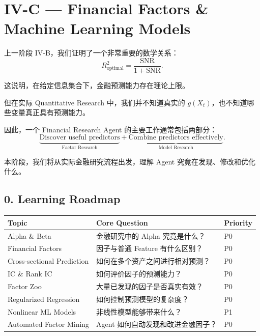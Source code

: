 \hypertarget{part-4-63-0001-iv-c-financial-factors-machine-learning-models}{%
\section{IV-C --- Financial Factors \& Machine Learning Models}\label{part-4-63-0001-iv-c-financial-factors-machine-learning-models}}

上一阶段 IV-B，我们证明了一个非常重要的数学关系：
\[R_{\mathrm{optimal}}^2
=
\frac{\mathrm{SNR}}{1+\mathrm{SNR}}.\]

这说明，在给定信息集合下，金融预测能力存在理论上限。

但在实际 Quantitative Research 中，我们并不知道真实的 \(g(X_t)\)，也不知道哪些变量真正具有预测能力。

因此，一个 Financial Research Agent 的主要工作通常包括两部分：
\[\underbrace{\text{Discover useful predictors}}_{\text{Factor Research}}
+
\underbrace{\text{Combine predictors effectively}}_{\text{Model Research}}.\]

本阶段，我们将从实际金融研究流程出发，理解 Agent 究竟在发现、修改和优化什么。

\hypertarget{part-4-63-0001-learning-roadmap}{%
\subsection{0. Learning Roadmap}\label{part-4-63-0001-learning-roadmap}}

\begin{readertable}
\begin{longtable}[]{@{}
  >{\raggedright\arraybackslash}p{}
  >{\raggedright\arraybackslash}p{}
  >{\raggedright\arraybackslash}p{}@{}}
\toprule
Topic & Core Question & Priority \\
\midrule
\endhead
Alpha \& Beta & 金融研究中的 Alpha 究竟是什么？ & P0 \\
Financial Factors & 因子与普通 Feature 有什么区别？ & P0 \\
Cross-sectional Prediction & 如何在多个资产之间进行相对预测？ & P0 \\
IC \& Rank IC & 如何评价因子的预测能力？ & P0 \\
Factor Zoo & 大量已发现的因子是否真实有效？ & P0 \\
Regularized Regression & 如何控制预测模型的复杂度？ & P0 \\
Nonlinear ML Models & 非线性模型能够带来什么？ & P1 \\
Automated Factor Mining & Agent 如何自动发现和改进金融因子？ & P0 \\
\bottomrule
\end{longtable}
\end{readertable}

